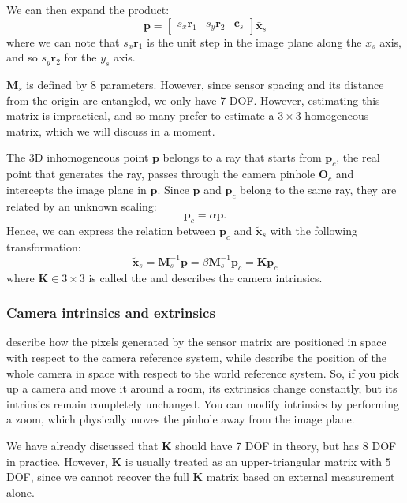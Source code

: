 We can then expand the product:
$$\mathbf{p}=\begin{bmatrix}
s_{x}\mathbf{r}_{1} & s_{y}\mathbf{r}_{2} & \mathbf{c}_{s}
\end{bmatrix}\bar{\mathbf{x}}_{s}$$
where we can note that $s_{x}\mathbf{r}_{1}$ is the unit step in the image plane along the $x_{s}$ axis, and so $s_{y}\mathbf{r}_{2}$ for the $y_{s}$ axis.

$\mathbf{M}_{s}$ is defined by 8 parameters. However, since sensor spacing and its distance from the origin are entangled, we only have 7 DOF.
However, estimating this matrix is impractical, and so many prefer to estimate a $3\times 3$ homogeneous matrix, which we will discuss in a moment.

The 3D inhomogeneous point $\mathbf{p}$ belongs to a ray that starts from $\mathbf{p}_{c}$, the real point that generates the ray, passes through the camera pinhole $\mathbf{O}_{c}$ and intercepts the image plane in $\mathbf{p}$.
Since $\mathbf{p}$ and $\mathbf{p}_{c}$ belong to the same ray, they are related by an unknown scaling:
$$\mathbf{p}_{c}=\alpha\mathbf{p}.$$
Hence, we can express the relation between $\mathbf{p}_{c}$ and $\tilde{\mathbf{x}}_{s}$ with the following transformation:
$$\tilde{\mathbf{x}}_{s}=\mathbf{M}_{s}^{-1}\mathbf{p}= \beta \mathbf{M}^{-1}_{s}\mathbf{p}_{c}=\mathbf{K}\mathbf{p}_{c}$$
where $\mathbf{K}\in 3\times3$ is called the  and describes the camera intrinsics.

\subsubsection{Camera intrinsics and extrinsics}
 describe how the pixels generated by the sensor matrix are positioned in space with respect to the camera reference system, while  describe the position of the whole camera in space with respect to the world reference system.
So, if you pick up a camera and move it around a room, its extrinsics change constantly, but its intrinsics remain completely unchanged. You can modify intrinsics by performing a zoom, which physically moves the pinhole away from the image plane.

We have already discussed that $\mathbf{K}$ should have 7 DOF in theory, but has 8 DOF in practice. However, $\mathbf{K}$ is usually treated as an upper-triangular matrix with $5$ DOF, since we cannot recover the full $\mathbf{K}$ matrix based on external measurement alone.

